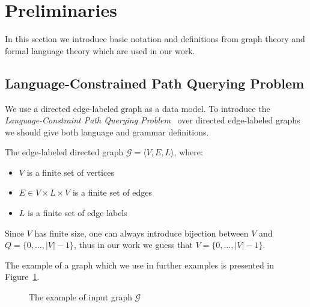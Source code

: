 \section{Preliminaries}

In this section we introduce basic notation and definitions from graph theory and formal language theory which are used in our work.

\subsection{Language-Constrained Path Querying Problem}

We use a directed edge-labeled graph as a data model. 
To introduce the \textit{Language-Constraint Path Querying Problem}~\cite{!!!} over directed edge-labeled graphs we should give both language and grammar definitions.

\begin{definition}
The edge-labeled directed graph $\mathcal{G} = \langle V,E,L \rangle$, where:
\begin{itemize}
    \item $V$ is a finite set of vertices
    \item $E \in V \times L \times V$ is a finite set of edges
    \item $L$ is a finite set of edge labels
\end{itemize}
\end{definition}

Since $V$ has finite size, one can always introduce bijection between $V$ and $Q = \{0, \ldots, |V|-1\}$, thus in our work we guess that $V = \{0, \ldots, |V|-1\}$.

The example of a graph which we use in further examples is presented in Figure~\ref{fig:example_input_graph}.

\begin{figure}[h]
    \centering        
    \caption{The example of input graph $\mathcal{G}$}
    \label{fig:example_input_graph}
\end{figure}

